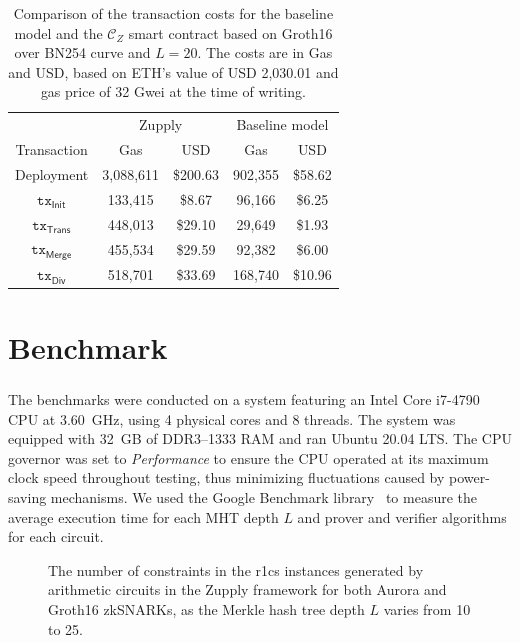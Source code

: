 \begin{table}[t] %
	\caption[The Cost of Transactions in the Zupply Framework]{Comparison of the transaction costs for the baseline model and the $\mathcal{C}_Z$ smart contract based on Groth16 over BN254 curve and $L=20$. The costs are in Gas and USD, based on ETH's value of USD 2,030.01 and gas price of 32 Gwei at the time of writing.}
	\centering
{
	\begin{tabular}{ccccc}
		\toprule
        & \multicolumn{2}{c}{Zupply} & \multicolumn{2}{c}{Baseline model}\\ %
		{Transaction} & {Gas} & {USD} & {Gas} & {USD}\\
		\midrule
		Deployment & 3,088,611 & \$200.63 & 902,355 & \$58.62 \\ %
		$\texttt{tx}_{\textsf{Init}}$ & 133,415 & \$8.67 & 96,166 & \$6.25 \\ %
		$\texttt{tx}_{\textsf{Trans}}$ & 448,013 & \$29.10 & 29,649 & \$1.93\\ %
		$\texttt{tx}_{\textsf{Merge}}$ & 455,534 & \$29.59 & 92,382 & \$6.00 \\ %
		$\texttt{tx}_{\textsf{Div}}$ & 518,701 & \$33.69 & 168,740 & \$10.96\\ %
		\bottomrule
	\end{tabular}
 }
	\label{tab:transaction_gas}
\end{table}


\section{Benchmark}
\label{sec:zupply-benchmark}
The benchmarks were conducted on a system featuring an Intel\textsuperscript{\textregistered} Core\texttrademark{} i7-4790 CPU at 3.60~GHz, using 4 physical cores and 8 threads. The system was equipped with 32~GB of DDR3–1333 RAM and ran Ubuntu 20.04 LTS. The CPU governor was set to \textit{Performance} to ensure the CPU operated at its maximum clock speed throughout testing, thus minimizing fluctuations caused by power-saving mechanisms. We used the Google Benchmark library~\cite{google_benchmark} to measure the average execution time for each \textsf{MHT} depth \( L \) and prover and verifier algorithms for each circuit.

\begin{figure}
    \centering
    \scalebox{.81}{
    
    }
    \caption[Number of constraints in the R1CS instances in Zupply]{The number of constraints in the \gls{r1cs} instances generated by arithmetic circuits in the Zupply framework for both Aurora \cite{Aurora2019} and Groth16 \cite{Groth2016} zkSNARKs, as the Merkle hash tree depth \(L\) varies from 10 to 25.}
    \label{fig:num_constraints}
\end{figure}

